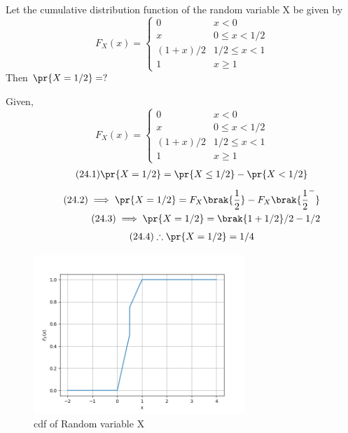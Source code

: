 
    Let the cumulative distribution function of the random variable X be given by 
    $$F_{X}(x)=\left\{
    \begin{array}{ll}
      0 & x<0 \\
      x & 0\leq x<1/2\\
      (1+x)/2 & 1/2\leq x <1\\
      1 & x\geq 1
    \end{array} 
    \right. $$
    Then $\pr{X=1/2}=?$

Given,
$$F_{X}(x)=\left\{
    \begin{array}{ll}
      0 & x<0 \\
      x & 0\leq x<1/2\\
      (1+x)/2 & 1/2\leq x <1\\
      1 & x\geq 1
    \end{array} 
    \right. $$
\begin{align}
\tag{24.1}
\pr{X=1/2}=\pr{X\leq 1/2}-\pr{X<1/2}
\end{align}
\begin{align}
\tag{24.2}
\implies \pr{X=1/2}=F_{X}\brak{\frac{1}{2}}-F_{X}\brak{\frac{1}{2}^-}\\
\tag{24.3}
\implies \pr{X=1/2}=\brak{1+1/2}/2-1/2
\end{align}
\begin{align}
\tag{24.4}
\therefore \pr{X=1/2}=1/4
\end{align}
\newpage
\begin{figure}[t!]
\centering
\includegraphics[width=8cm]{cdf_plot.png}
\caption{cdf of Random variable X}
\end{figure}

